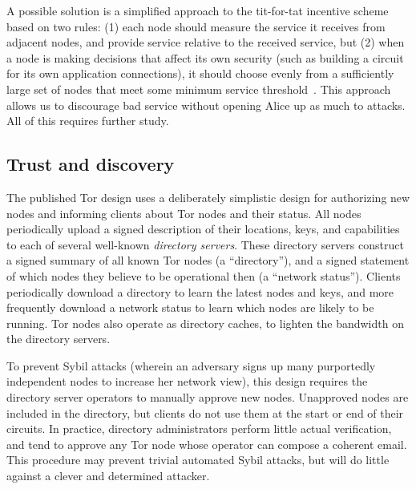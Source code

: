 \documentclass{llncs}
\begin{document}

A possible solution is a simplified approach to the tit-for-tat
incentive scheme based on two rules: (1) each node should measure the
service it receives from adjacent nodes, and provide service relative
to the received service, but (2) when a node is making decisions that
affect its own security (such as building a circuit for its own
application connections), it should choose evenly from a sufficiently
large set of nodes that meet some minimum service
threshold~\cite{casc-rep}.  This approach allows us to discourage
bad service
without opening Alice up as much to attacks.  All of this requires
further study.

\subsection{Trust and discovery}
\label{subsec:trust-and-discovery}

The published Tor design uses a deliberately simplistic design for
authorizing new nodes and informing clients about Tor nodes and their status.
All nodes periodically upload a signed description
of their locations, keys, and capabilities to each of several well-known {\it
  directory servers}.  These directory servers construct a signed summary
of all known Tor nodes (a ``directory''), and a signed statement of which
nodes they
believe to be operational then (a ``network status'').  Clients
periodically download a directory to learn the latest nodes and
keys, and more frequently download a network status to learn which nodes are
likely to be running.  Tor nodes also operate as directory caches, to
lighten the bandwidth on the directory servers.

To prevent Sybil attacks (wherein an adversary signs up many
purportedly independent nodes to increase her network view),
this design
requires the directory server operators to manually
approve new nodes.  Unapproved nodes are included in the directory,
but clients
do not use them at the start or end of their circuits.  In practice,
directory administrators perform little actual verification, and tend to
approve any Tor node whose operator can compose a coherent email.
This procedure
may prevent trivial automated Sybil attacks, but will do little
against a clever and determined attacker.
\end{document}
